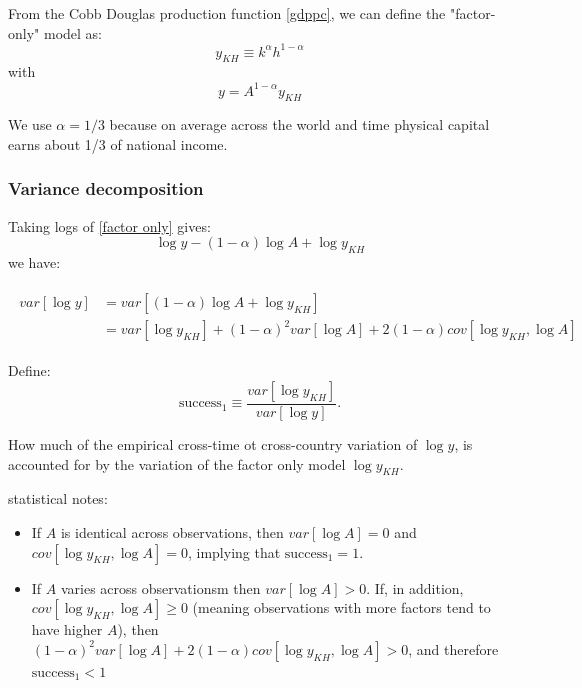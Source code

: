 \documentclass[11pt]{article}
\begin{document}
From the Cobb Douglas production function \eqref{gdppc}, we can define the "factor-only" model as:
\[y_{KH} \equiv k^\alpha h^{1-\alpha}\]
with
\begin{equation}
\label{factor only}
    y = A^{1-\alpha} y_{KH}
\end{equation}


We use $\alpha= 1/3$ because on average across the world and time physical capital earns about 1/3 of national income.
\subsubsection{Variance decomposition}
Taking logs of \eqref{factor only} gives:
\[\log y - (1-\alpha) \log A + \log y_{KH}\]
we have:
   
    \begin{align}
     \label{variance decomp}
    \begin{split}
        var\left[\log y\right] &= var\left[(1-\alpha) \log A + \log y_{KH}\right] \\
        &= var\left[ \log y_{KH} \right] + (1-\alpha)^2 var\left[ \log A\right] + 2(1-\alpha) cov\left[ \log y_{KH}, \log A \right]
    \end{split}
    \end{align}

    \begin{shaded}
        Define:
        \begin{equation}
        \label{success1}
            \text{success}_1 \equiv \dfrac{var\left[ \log y_{KH}\right]}{var\left[ \log y \right]}.
        \end{equation}
        

        How much of the empirical cross-time ot cross-country variation of $\log y$, is accounted for by the variation of the factor only model $\log y_{KH}$.
    \end{shaded}
        \begin{note}
        statistical notes:
        \begin{itemize}
            \item If $A$ is identical across observations, then $var\left[\log A\right] = 0$ and $cov\left[ \log y_{KH}, \log A \right]= 0$, implying that $\text{success}_1 = 1$.
            \item If $A$ varies across observationsm then $var \left[ \log A \right] >0$. If, in addition, $cov\left[ \log y_{KH}, \log A \right] \geq 0$ (meaning observations with more factors tend to have higher $A$), then $(1-\alpha)^2 var\left[ \log A\right] + 2(1-\alpha) cov\left[ \log y_{KH}, \log A \right]>0$, and therefore $\text{success}_1<1$
        \end{itemize}
        \end{note}
\end{document}
